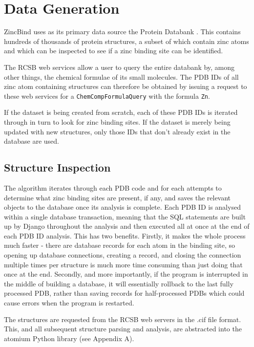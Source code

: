 \section{Data Generation}

ZincBind uses as its primary data source the Protein Databank . This contains hundreds of thousands of protein structures, a subset of which contain zinc atoms and which can be inspected to see if a zinc binding site can be identified.

The RCSB web services allow a user to query the entire databank by, among other things, the chemical formulae of its small molecules. The PDB IDs of all zinc atom containing structures can therefore be obtained by issuing a request to these web services for a \verb|ChemCompFormulaQuery| with the formula \verb|Zn|.

If the dataset is being created from scratch, each of these PDB IDs is iterated through in turn to look for zinc binding sites. If the dataset is merely being updated with new structures, only those IDs that don't already exist in the database are used.

\subsection{Structure Inspection}

The algorithm iterates through each PDB code and for each attempts to determine what zinc binding sites are present, if any, and saves the relevant objects to the database once its analysis is complete. Each PDB ID is analysed within a single database transaction, meaning that the SQL statements are built up by Django throughout the analysis and then executed all at once at the end of each PDB ID analysis. This has two benefits. Firstly, it makes the whole process much faster - there are database records for each atom in the binding site, so opening up database connections, creating a record, and closing the connection multiple times per structure is much more time consuming than just doing that once at the end. Secondly, and more importantly, if the program is interrupted in the middle of building a database, it will essentially rollback to the last fully processed PDB, rather than saving records for half-processed PDBs which could cause errors when the program is restarted.

The structures are requested from the RCSB web servers in the .cif file format. This, and all subsequent structure parsing and analysis, are abstracted into the atomium Python library (see Appendix A).

